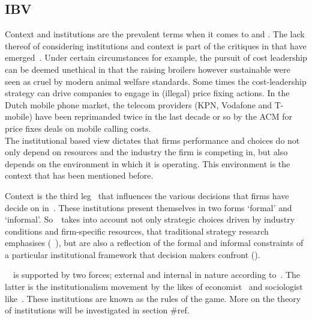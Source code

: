 \subsection{\glsdesc{IBV}}

Context and institutions are the prevalent terms when it comes to \rbv and \inbv.
The lack thereof of considering institutions and context is part of the critiques in that have emerged~\cite{Narayanan:2005}.
Under certain circumstances for example, the pursuit of cost leadership can be deemed unethical in that the raising broilers however sustainable were seen as cruel by modern animal welfare standards. 
Some times the cost-leadership strategy can drive companies to engage in (illegal) price fixing actions. 
In the Dutch mobile phone market, the telecom providers (KPN, Vodafone and T-mobile) have been reprimanded twice in the last decade or so by the \gls{ACM} for price fixes deals on mobile calling costs. \\


 
 
The institutional based view dictates that firms performance and choices do not only depend on resources and the industry the firm is competing in, but also depends on the environment in which it is operating. 
This environment is the context that has been mentioned before.


Context is the third leg~\cite{Peng:2009} that influences the various decisions that firms have decide on in~\ib. 
These institutions present themselves in two forms `formal' and `informal'. 
So~\ibv~takes into account not only strategic choices driven by industry conditions and firm-specific resources, that traditional strategy research emphasises (~\cite{Porter:1980,Barney:1991}), but are also a reflection of the formal and informal constraints of a particular institutional framework that decision makers confront (\cite{Oliver:1997,Scott:1995}). 

~\ibv~is supported by two forces; external and internal in nature according to~\cite{Peng:2009}. 
The latter is the institutionalism movement by the likes of economist~\cite{North:1990} and sociologist like~\cite{DiMaggio:1983,Scott:1995}. 
These institutions are known as the rules of the game.
More on the theory of institutions will be investigated in section #ref.\\

